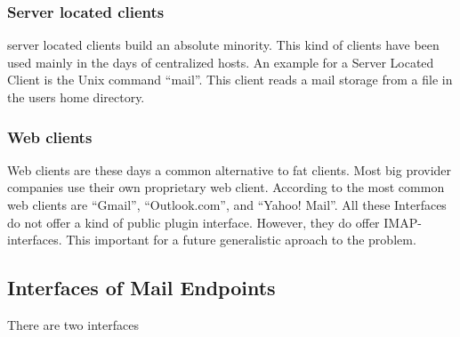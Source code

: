 \subsubsection{Server located clients}
server located clients build an absolute minority. This kind of clients have been used mainly in the days of centralized hosts. An example for a Server Located Client is the Unix command "`mail"'. This client reads a mail storage from a file in the users home directory.

\subsubsection{Web clients}
Web clients are these days a common alternative to fat clients. Most big provider companies use their own proprietary web client. According to \cite{clientDistribution2} the most common web clients are "`Gmail"', "`Outlook.com"', and "`Yahoo! Mail"'. All these Interfaces do not offer a kind of public plugin interface. However,  they do offer IMAP-interfaces. This important for a future generalistic aproach to the problem.

\subsection{Interfaces of Mail Endpoints}
There are two interfaces 

